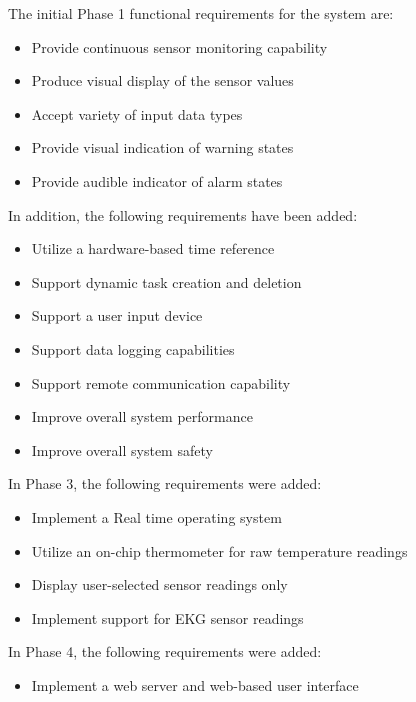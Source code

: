 \documentclass[12pt]{article} %
\begin{document}
\begin{itemize}[$$]
  \item The initial Phase 1 functional requirements for the system are:
    \begin{itemize}[$\bullet$]
      \item Provide continuous sensor monitoring capability
      \item Produce visual display of the sensor values
      \item Accept variety of input data types
      \item Provide visual indication of warning states
      \item Provide audible indicator of alarm states
    \end{itemize}
  \item In addition, the following requirements have been added:
    \begin{itemize}[$\bullet$]
      \item Utilize a hardware-based time reference
      \item Support dynamic task creation and deletion
      \item Support a user input device
      \item Support data logging capabilities
      \item Support remote communication capability
      \item Improve overall system performance
      \item Improve overall system safety
    \end{itemize}
	\item In Phase 3, the following requirements were added:
		\begin{itemize}
			\item Implement a Real time operating system
			\item Utilize an on-chip thermometer for raw temperature readings
			\item Display user-selected sensor readings only
			\item Implement support for EKG sensor readings
		\end{itemize}
	\item In Phase 4, the following requirements were added:
		\begin{itemize}
			\item Implement a web server and web-based user interface
		\end{itemize}
\end{itemize}
\end{document}
